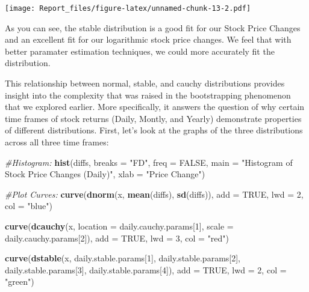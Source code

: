 \documentclass[]{article}
\newenvironment{Shaded}{\begin{snugshade}}{\end{snugshade}}
\newcommand{\CommentTok}[1]{\textcolor[rgb]{0.56,0.35,0.01}{\textit{#1}}}
\newcommand{\DataTypeTok}[1]{\textcolor[rgb]{0.13,0.29,0.53}{#1}}
\newcommand{\DecValTok}[1]{\textcolor[rgb]{0.00,0.00,0.81}{#1}}
\newcommand{\KeywordTok}[1]{\textcolor[rgb]{0.13,0.29,0.53}{\textbf{#1}}}
\newcommand{\NormalTok}[1]{#1}
\newcommand{\OtherTok}[1]{\textcolor[rgb]{0.56,0.35,0.01}{#1}}
\newcommand{\StringTok}[1]{\textcolor[rgb]{0.31,0.60,0.02}{#1}}
\begin{document}
\texttt{[image: Report\_files/figure-latex/unnamed-chunk-13-2.pdf]}

As you can see, the stable distribution is a good fit for our Stock
Price Changes and an excellent fit for our logarithmic stock price
changes. We feel that with better paramater estimation techniques, we
could more accurately fit the distribution.

This relationship between normal, stable, and cauchy distributions
provides insight into the complexity that was raised in the
bootstrapping phenomenon that we explored earlier. More specifically, it
answers the question of why certain time frames of stock returns (Daily,
Montly, and Yearly) demonstrate properties of different distributions.
First, let's look at the graphs of the three distributions across all
three time frames:

\begin{Shaded}
\begin{Highlighting}[]
\CommentTok{#Histogram:}
\KeywordTok{hist}\NormalTok{(diffs, }\DataTypeTok{breaks =} \StringTok{"FD"}\NormalTok{, }\DataTypeTok{freq =} \OtherTok{FALSE}\NormalTok{, }\DataTypeTok{main =} \StringTok{"Histogram of Stock Price Changes (Daily)"}\NormalTok{, }\DataTypeTok{xlab =} \StringTok{"Price Change"}\NormalTok{)}

\CommentTok{#Plot Curves:}
\KeywordTok{curve}\NormalTok{(}\KeywordTok{dnorm}\NormalTok{(x, }\KeywordTok{mean}\NormalTok{(diffs), }\KeywordTok{sd}\NormalTok{(diffs)), }\DataTypeTok{add =} \OtherTok{TRUE}\NormalTok{, }\DataTypeTok{lwd =} \DecValTok{2}\NormalTok{, }\DataTypeTok{col =} \StringTok{"blue"}\NormalTok{)}

\KeywordTok{curve}\NormalTok{(}\KeywordTok{dcauchy}\NormalTok{(x, }\DataTypeTok{location =}\NormalTok{ daily.cauchy.params[}\DecValTok{1}\NormalTok{], }
              \DataTypeTok{scale =}\NormalTok{  daily.cauchy.params[}\DecValTok{2}\NormalTok{]), }
      \DataTypeTok{add =} \OtherTok{TRUE}\NormalTok{, }\DataTypeTok{lwd =} \DecValTok{3}\NormalTok{, }\DataTypeTok{col =} \StringTok{"red"}\NormalTok{)}

\KeywordTok{curve}\NormalTok{(}\KeywordTok{dstable}\NormalTok{(x, daily.stable.params[}\DecValTok{1}\NormalTok{], daily.stable.params[}\DecValTok{2}\NormalTok{],}
\NormalTok{              daily.stable.params[}\DecValTok{3}\NormalTok{], daily.stable.params[}\DecValTok{4}\NormalTok{]), }
      \DataTypeTok{add =} \OtherTok{TRUE}\NormalTok{, }\DataTypeTok{lwd =} \DecValTok{2}\NormalTok{, }\DataTypeTok{col =} \StringTok{"green"}\NormalTok{)}
\end{Highlighting}
\end{Shaded}
\end{document}
